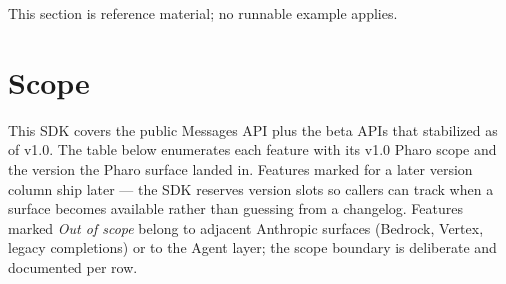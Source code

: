 \documentclass[a4paper,10pt,fleqn]{article}
\begin{document}
This section is reference material; no runnable example applies.

\medskip
{}

\section{Scope}
\label{sec:scope}

This SDK covers the public Messages API plus the beta APIs that
stabilized as of v1.0.  The table below enumerates each feature with
its v1.0 Pharo scope and the version the Pharo surface landed in.
Features marked for a later version column ship later --- the SDK
reserves version slots so callers can track when a surface becomes
available rather than guessing from a changelog.  Features marked
\emph{Out of scope} belong to adjacent Anthropic surfaces (Bedrock,
Vertex, legacy completions) or to the Agent layer; the scope boundary
is deliberate and documented per row.
\end{document}
